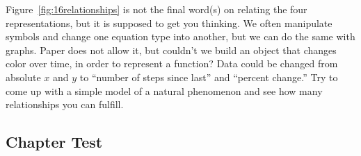 Figure~\ref{fig:16relationships} is not the final word(s) on relating the four representations,
but it is supposed to get you thinking.  We often manipulate symbols and change one
equation type into another, but we can do the same with graphs.  Paper does not
allow it, but couldn't we build an object that changes color over time, in order to
represent a function?  Data could be changed from absolute $x$ and $y$ to
``number of steps since last'' and ``percent change.''  Try to come up with a simple 
model of a natural phenomenon and see how many relationships you can
fulfill.

\subsection{Chapter Test}
\noindent{}
\newpage
